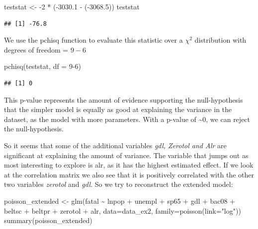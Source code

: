 \documentclass[
]{article}
\newenvironment{Shaded}{\begin{snugshade}}{\end{snugshade}}
\newcommand{\AttributeTok}[1]{\textcolor[rgb]{0.77,0.63,0.00}{#1}}
\newcommand{\DecValTok}[1]{\textcolor[rgb]{0.00,0.00,0.81}{#1}}
\newcommand{\FloatTok}[1]{\textcolor[rgb]{0.00,0.00,0.81}{#1}}
\newcommand{\FunctionTok}[1]{\textcolor[rgb]{0.00,0.00,0.00}{#1}}
\newcommand{\NormalTok}[1]{#1}
\newcommand{\OtherTok}[1]{\textcolor[rgb]{0.56,0.35,0.01}{#1}}
\newcommand{\SpecialCharTok}[1]{\textcolor[rgb]{0.00,0.00,0.00}{#1}}
\newcommand{\StringTok}[1]{\textcolor[rgb]{0.31,0.60,0.02}{#1}}
\begin{document}
\begin{Shaded}
\begin{Highlighting}[]
\NormalTok{teststat }\OtherTok{\textless{}{-}} \SpecialCharTok{{-}}\DecValTok{2} \SpecialCharTok{*}\NormalTok{ (}\SpecialCharTok{{-}}\FloatTok{3030.1} \SpecialCharTok{{-}}\NormalTok{ (}\SpecialCharTok{{-}}\FloatTok{3068.5}\NormalTok{))}
\NormalTok{teststat}
\end{Highlighting}
\end{Shaded}

\begin{verbatim}
## [1] -76.8
\end{verbatim}

We use the pchisq function to evaluate this statistic over a \(\chi^2\)
distribution with degrees of freedom = \(9-6\)

\begin{Shaded}
\begin{Highlighting}[]
\FunctionTok{pchisq}\NormalTok{(teststat, }\AttributeTok{df =} \DecValTok{9{-}6}\NormalTok{)}
\end{Highlighting}
\end{Shaded}

\begin{verbatim}
## [1] 0
\end{verbatim}

This p-value represents the amount of evidence supporting the
null-hypothesis that the simpler model is equally as good at explaining
the variance in the dataset, as the model with more parameters. With a
p-value of \textasciitilde0, we can reject the null-hypothesis.

So it seems that some of the additional variables \emph{gdl, Zerotol and
Alr} are significant at explaining the amount of variance. The variable
that jumps out as most interesting to explore is alr, as it has the
highest estimated effect. If we look at the correlation matrix we also
see that it is positively correlated with the other two variables
\emph{zerotol} and \emph{gdl}. So we try to reconstruct the extended
model:

\begin{Shaded}
\begin{Highlighting}[]
\NormalTok{poisson\_extended }\OtherTok{\textless{}{-}} \FunctionTok{glm}\NormalTok{(fatal }\SpecialCharTok{\textasciitilde{}}\NormalTok{ lnpop }\SpecialCharTok{+}\NormalTok{ unempl }\SpecialCharTok{+}\NormalTok{ sp65 }\SpecialCharTok{+}\NormalTok{ gdl }\SpecialCharTok{+}\NormalTok{ bac08 }\SpecialCharTok{+}\NormalTok{ beltsc }\SpecialCharTok{+}\NormalTok{ beltpr }\SpecialCharTok{+}\NormalTok{ zerotol }\SpecialCharTok{+}\NormalTok{ alr, }\AttributeTok{data=}\NormalTok{data\_ex2, }\AttributeTok{family=}\FunctionTok{poisson}\NormalTok{(}\AttributeTok{link=}\StringTok{"log"}\NormalTok{))}
\FunctionTok{summary}\NormalTok{(poisson\_extended)}
\end{Highlighting}
\end{Shaded}
\end{document}
